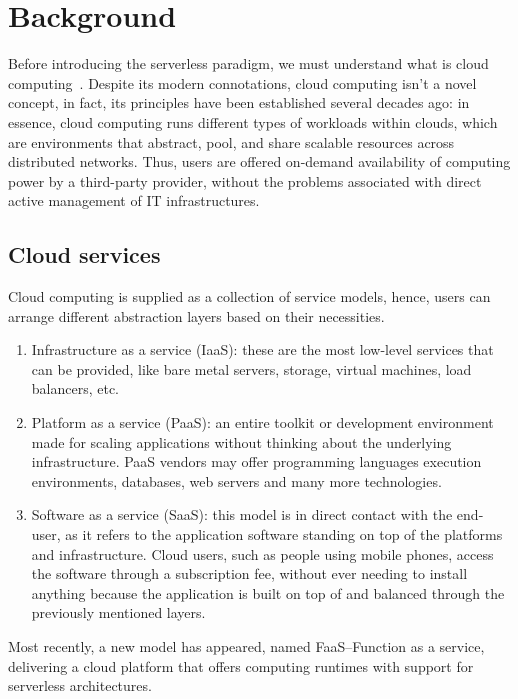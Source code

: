 \chapter{Background}
\label{chap:background}

Before introducing the serverless paradigm,
we must understand what is cloud computing~\cite{nist}.
Despite its modern connotations, cloud computing
isn't a novel concept, in fact, its principles have been established
several decades ago: in essence, cloud computing
runs different types of workloads within clouds, which are environments that abstract, pool,
and share scalable resources across distributed networks.
Thus, users are offered on-demand availability of computing power by a third-party provider,
without the problems associated with direct active management of IT infrastructures.

\section{Cloud services}

Cloud computing is supplied as a collection of service models,
hence, users can arrange different abstraction layers based on their necessities.

\begin{enumerate}
  \item Infrastructure as a service (IaaS): these are the most low-level services that can be provided,
    like bare metal servers, storage, virtual machines, load balancers, etc.
  \item Platform as a service (PaaS): an entire toolkit or development environment
    made for scaling applications without thinking about the underlying infrastructure.
    PaaS vendors may offer programming languages execution environments, databases,
    web servers and many more technologies.
  \item Software as a service (SaaS): this model is in direct contact with the end-user,
    as it refers to the application software standing on top of the platforms and infrastructure.
    Cloud users, such as people using mobile phones, access the software through a subscription fee,
    without ever needing to install anything because the application is built on top of and balanced through
    the previously mentioned layers.
\end{enumerate}

Most recently, a new model has appeared, named FaaS--Function as a service,
delivering a cloud platform that offers computing runtimes with support for serverless architectures.

